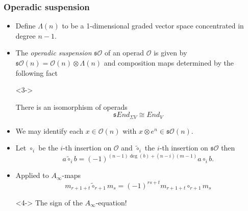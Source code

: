 \documentclass{beamer}
\theoremstyle{definition}
\begin{document}
\begin{frame}
\frametitle{Operadic suspension}
\begin{itemize}
\item<1-> Define $\Lambda(n)$ to be a 1-dimensional graded vector space concentrated in degree $n-1$.
\item<2-> The \emph{operadic suspension} $\mathfrak{s}\mathcal{O}$ of an operad $\mathcal{O}$ is given by $\mathfrak{s}\mathcal{O}(n)=\mathcal{O}(n)\otimes \Lambda(n)$ and composition maps determined by the following fact
\item[]<3->
\begin{theorem}[Markl]
There is an isomorphism of operads
\[ \mathfrak{s}End_{\Sigma V}\cong End_V\]
\end{theorem}
\end{itemize}
\end{frame}

\begin{frame}
\begin{itemize}

\item<1-> We may identify each $x\in\mathcal{O}(n)$ with $x\otimes e^n\in \mathfrak{s}\mathcal{O}(n)$.
\item<2-> Let $\circ_i$ be the $i$-th insertion on $\mathcal{O}$ and $\tilde{\circ}_i$ the $i$-th insertion on $\mathfrak{s}\mathcal{O}$ then
\[a\tilde{\circ}_ib=(-1)^{(n-1)\deg(b)+(n-i)(m-1)}a\circ_i b.\]
\item<3-> Applied to  $A_\infty$-maps 
\[m_{r+1+t}\tilde{\circ}_{r+1}m_s=(-1)^{rs+t}m_{r+1+t}\circ_{r+1}m_s\]
\item[]<4-> The sign of the $A_\infty$-equation!
\end{itemize}
\end{frame}
\end{document}
